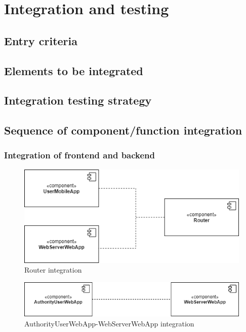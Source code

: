     \section{Integration and testing}
        \subsection{Entry criteria}
        \subsection{Elements to be integrated}
        \subsection{Integration testing strategy}
        \subsection{Sequence of component/function integration}

        \subsubsection{Integration of frontend and backend}
            \begin{figure}[H]
                \includegraphics[scale=0.7]{dd/resources/images/Integration-Router.png}
                \caption{Router integration}        
            \end{figure}
            \begin{figure}[H]
                \includegraphics[scale=0.65]{dd/resources/images/Integration-Web.png}
                \caption{AuthorityUserWebApp-WebServerWebApp integration}        
            \end{figure}

